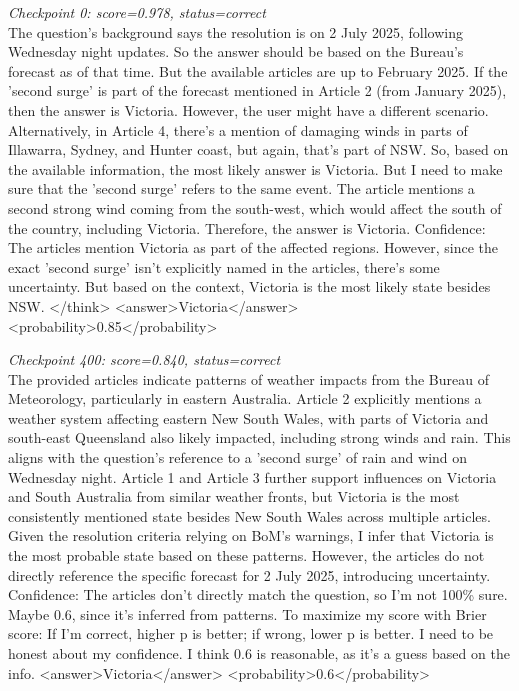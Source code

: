 \documentclass{article} %
\begin{document}
\noindent\textit{Checkpoint 0: score=0.978, status=correct}\\
The question's background says the resolution is on 2 July 2025, following Wednesday night updates. So the answer should be based on the Bureau's forecast as of that time. But the available articles are up to February 2025. If the 'second surge' is part of the forecast mentioned in Article 2 (from January 2025), then the answer is Victoria. However, the user might have a different scenario. Alternatively, in Article 4, there's a mention of damaging winds in parts of Illawarra, Sydney, and Hunter coast, but again, that's part of NSW. So, based on the available information, the most likely answer is Victoria. But I need to make sure that the 'second surge' refers to the same event. The article mentions a second strong wind coming from the south-west, which would affect the south of the country, including Victoria. Therefore, the answer is Victoria. Confidence: The articles mention Victoria as part of the affected regions. However, since the exact 'second surge' isn't explicitly named in the articles, there's some uncertainty. But based on the context, Victoria is the most likely state besides NSW. </think> <answer>Victoria</answer> <probability>0.85</probability>

\medskip

\noindent\textit{Checkpoint 400: score=0.840, status=correct}\\
The provided articles indicate patterns of weather impacts from the Bureau of Meteorology, particularly in eastern Australia. Article 2 explicitly mentions a weather system affecting eastern New South Wales, with parts of Victoria and south-east Queensland also likely impacted, including strong winds and rain. This aligns with the question's reference to a 'second surge' of rain and wind on Wednesday night. Article 1 and Article 3 further support influences on Victoria and South Australia from similar weather fronts, but Victoria is the most consistently mentioned state besides New South Wales across multiple articles. Given the resolution criteria relying on BoM's warnings, I infer that Victoria is the most probable state based on these patterns. However, the articles do not directly reference the specific forecast for 2 July 2025, introducing uncertainty. Confidence: The articles don't directly match the question, so I'm not 100\% sure. Maybe 0.6, since it's inferred from patterns. To maximize my score with Brier score: If I'm correct, higher p is better; if wrong, lower p is better. I need to be honest about my confidence. I think 0.6 is reasonable, as it's a guess based on the info. <answer>Victoria</answer> <probability>0.6</probability>
\end{document}
